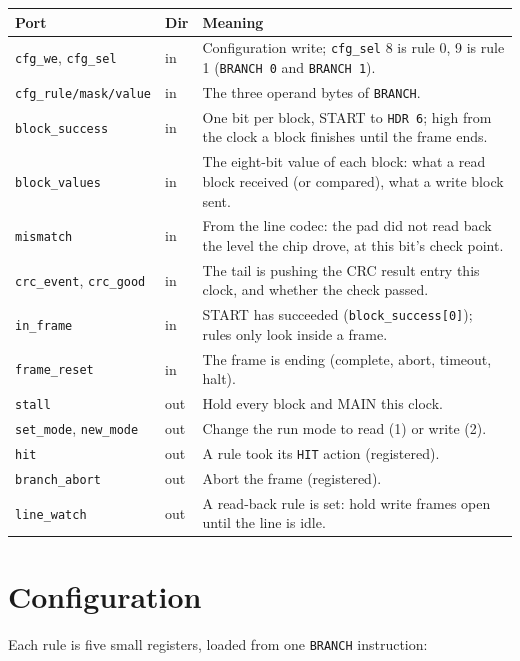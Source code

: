 \documentclass[11pt,a4paper]{article}
\newcommand{\sig}[1]{\texttt{#1}}
\begin{document}
\begin{center}
\begin{tabularx}{\linewidth}{@{}l l L@{}}
\toprule
Port & Dir & Meaning \\
\midrule
\sig{cfg\_we}, \sig{cfg\_sel} & in & Configuration write; \sig{cfg\_sel} 8 is rule 0, 9 is rule 1 (\sig{BRANCH 0} and \sig{BRANCH 1}). \\
\sig{cfg\_rule/mask/value} & in & The three operand bytes of \sig{BRANCH}. \\
\sig{block\_success} & in & One bit per block, START to \sig{HDR 6}; high from the clock a block finishes until the frame ends. \\
\sig{block\_values} & in & The eight-bit value of each block: what a read block received (or compared), what a write block sent. \\
\sig{mismatch} & in & From the line codec: the pad did not read back the level the chip drove, at this bit's check point. \\
\sig{crc\_event}, \sig{crc\_good} & in & The tail is pushing the CRC result entry this clock, and whether the check passed. \\
\sig{in\_frame} & in & START has succeeded (\sig{block\_success[0]}); rules only look inside a frame. \\
\sig{frame\_reset} & in & The frame is ending (complete, abort, timeout, halt). \\
\midrule
\sig{stall} & out & Hold every block and MAIN this clock. \\
\sig{set\_mode}, \sig{new\_mode} & out & Change the run mode to read (1) or write (2). \\
\sig{hit} & out & A rule took its \sig{HIT} action (registered). \\
\sig{branch\_abort} & out & Abort the frame (registered). \\
\sig{line\_watch} & out & A read-back rule is set: hold write frames open until the line is idle. \\
\bottomrule
\end{tabularx}
\end{center}

\section{Configuration}

Each rule is five small registers, loaded from one \sig{BRANCH} instruction:
\end{document}
